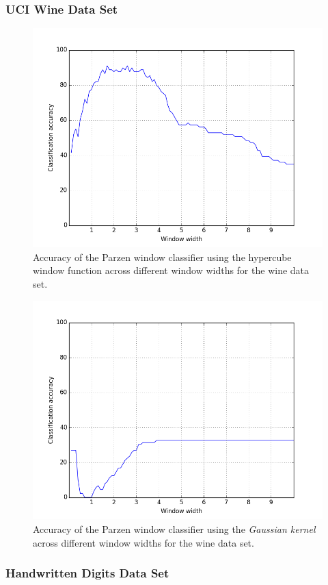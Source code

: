 \documentclass{article}
\numberwithin{figure}{section}
\begin{document}
\subsubsection{UCI Wine Data Set}
\begin{figure}[H]
\centering
\includegraphics[width=.8\textwidth]{p_box_wine}
\caption{Accuracy of the Parzen window classifier using the hypercube window function across different window widths for the wine data set.}
\label{pb_wine}
\end{figure}

\begin{figure}[H]
\centering
\includegraphics[width=.8\textwidth]{pg_wine}
\caption{Accuracy of the Parzen window classifier using the \emph{Gaussian kernel} across different window widths for the wine data set.}
\label{pg_wine}
\end{figure}


\subsubsection{Handwritten Digits Data Set}
\end{document}
